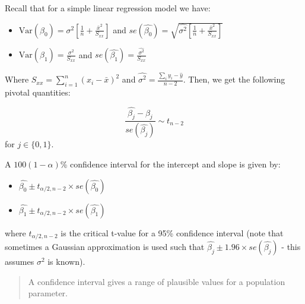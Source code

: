\documentclass[
  letterpaper,
  DIV=11,
  numbers=noendperiod]{scrartcl}
\begin{document}
\begin{tcolorbox}[enhanced jigsaw, coltitle=black, bottomtitle=1mm, arc=.35mm, colframe=quarto-callout-note-color-frame, left=2mm, opacityback=0, colback=white, title=\textcolor{quarto-callout-note-color}{\faInfo}\hspace{0.5em}{Re-cap on SLR}, toptitle=1mm, titlerule=0mm, breakable, rightrule=.15mm, bottomrule=.15mm, toprule=.15mm, colbacktitle=quarto-callout-note-color!10!white, leftrule=.75mm, opacitybacktitle=0.6]

Recall that for a simple linear regression model we have:

\begin{itemize}
\item
  \(\text{Var}(\hat{\beta}_0) = \sigma^2 \left[\frac{1}{n} + \frac{\bar{x}^2}{S_{xx}}\right]\)
  and
  \(se(\hat{\beta_0}) = \sqrt{\hat{\sigma^2} \left[\frac{1}{n} + \frac{\bar{x}^2}{S_{xx}}\right]}\)
\item
  \(\text{Var}(\hat{\beta}_1) = \frac{\sigma^2}{S_{xx}}\) and
  \(se(\hat{\beta_1}) = \frac{\hat{\sigma^2}}{S_{xx}}\)
\end{itemize}

Where \(S_{xx} = \sum_{i=1}^n (x_i-\bar{x})^2\) and
\(\hat{\sigma^2} = \frac{\sum_i y_i-\hat{y}}{n-2}\). Then, we get the
following pivotal quantities:

\[
\dfrac{\hat{\beta_j} - \beta_j}{se(\hat{\beta_j})} \sim t_{n-2}
\]for \(j \in \{0,1\}\).

\end{tcolorbox}

A \(100(1-\alpha)\)\% confidence interval for the intercept and slope is
given by:

\begin{itemize}
\item
  \(\hat{\beta_0} \pm t_{\alpha/2,n-2} \times se(\hat{\beta_0})\)
\item
  \(\hat{\beta_1} \pm t_{\alpha/2,n-2} \times se(\hat{\beta_1})\)
\end{itemize}

where \(t_{\alpha/2,n-2}\) is the critical t-value for a 95\% confidence
interval (note that sometimes a Gaussian approximation is used such that
\(\hat{\beta_j} \pm 1.96 \times se(\hat{\beta_j})\) - this assumes
\(\sigma^2\) is known).

\begin{quote}
A confidence interval gives a range of plausible values for a population
parameter.
\end{quote}
\end{document}
